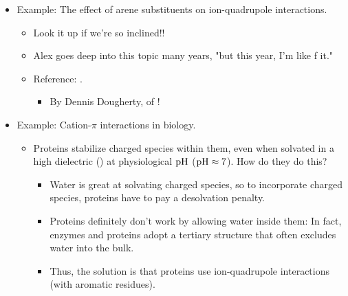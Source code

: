\documentclass[../notes.tex]{subfiles}
\begin{document}
\begin{itemize}
\begin{itemize}
        \item Specifically, harder ions bind better to quadrupoles, and softer ones binds worse.
        \item This is consistent with the inverse distance dependence in all of our interaction equations.\footnote{Note: HSAB (as a polarizability- and dispersion-directed phenomenon) does indeed favor the binding of "soft" benzene to "soft" ions, but the fact that we see this relationship here implies that electrostatics (i.e., classical ion-quadrupole attractions) are \emph{more} active in determing benzene's affinity for cations \parencite[163-64]{bib:intQuaBio}.}
        \item See \textcite{bib:intQuaBio}, specifically the section entitled "The Fundamental Interaction: Gas-Phase Studies" and refs. 2-7 cited therein.
    \end{itemize}
    \item Example: The effect of arene substituents on ion-quadrupole interactions.
    \begin{itemize}
        \item Look it up if we're so inclined!!
        \item Alex goes deep into this topic many years, "but this year, I'm like f it."
        \item Reference: \textcite{bib:ionQuaSubs}.
        \begin{itemize}
            \item By Dennis Dougherty, of \textcite{bib:Anslyn}!
        \end{itemize}
    \end{itemize}
    \item Example: Cation-$\pi$ interactions in biology.
    \begin{itemize}
        \item Proteins stabilize charged species within them, even when solvated in a high dielectric () at physiological $\textup{pH}$ ($\textup{pH}\approx 7$). How do they do this?
        \begin{itemize}
            \item Water is great at solvating charged species, so to incorporate charged species, proteins have to pay a desolvation penalty.
            \item Proteins definitely don't work by allowing water inside them: In fact, enzymes and proteins adopt a tertiary structure that often excludes water into the bulk.
            \item Thus, the solution is that proteins use ion-quadrupole interactions (with aromatic residues).

\end{itemize}
\end{itemize}
\end{itemize}
\end{document}
